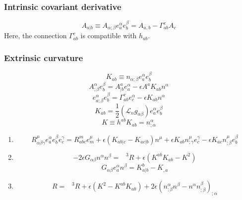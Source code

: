 \subsubsection{Intrinsic covariant derivative}
\[A_{a|b} \equiv A_{\alpha;\beta} e_a^{\alpha} e_b^{\beta} = A_{a,b} - \Gamma^c_{ab}A_c\]
Here, the connection $\Gamma^c_{ab}$ is compatible with $h_{ab}$.
\subsubsection{Extrinsic curvature}
\[K_{ab} \equiv n_{\alpha;\beta}e_a^{\alpha} e_b^{\beta}\]
\[A^{\alpha}_{;\beta} e_b^{\beta} = A^a_{|b} e_a^{\alpha} - \epsilon A^a K_{ab}n^{\alpha}\]
\[e^{\alpha}_{a;\beta} e_b^{\beta} = \Gamma^c_{ab}e_c^{\alpha} - \epsilon K_{ab}n^{\alpha}\]
\[K_{ab} = \frac{1}{2}(\mathcal{L}_n g_{\alpha \beta})e_a^{\alpha} e_b^{\beta}\]
\[K \equiv h^{ab}K_{ab} = n^{\alpha}_{;\alpha}\]

\begin{newthem}
\begin{enumerate}
\item \[R^{\mu}_{\alpha \beta \gamma} e_a^{\alpha} e_b^{\beta} e_c^{\gamma} = R^m_{abc} e_m^{\mu} + \epsilon (K_{ab|c} - K_{ac|b})n^{\mu} + \epsilon K_{ab} n^{\mu}_{;\gamma}e_c^{\gamma} - \epsilon K_{ac} n^{\mu}_{;\beta}e_b^{\beta}\]
\item \[-2\epsilon G_{\alpha \beta} n^{\alpha} n^{\beta} = \phantom{R}^3R + \epsilon(K^{ab}K_{ab}-K^2)\]
\[G_{\alpha \beta} e_a^{\alpha}n^{\beta} = K^b_{a|b} - K_{,a}\]
\item \[R = \phantom{R}^3R + \epsilon(K^2-K^{ab}K_{ab}) + 2\epsilon(n^{\alpha}_{;\beta}n^{\beta}-n^{\alpha}n^{\beta}_{;\beta})_{;\alpha}\]
\end{enumerate}
\end{newthem}

